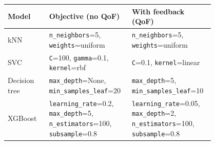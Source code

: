 \begin{tabular}{lp{0.4\linewidth}p{0.4\linewidth}}
\toprule
Model & Objective (no QoF) & With feedback (QoF) \\
\midrule
kNN & \texttt{n\_neighbors}=5, \texttt{weights}=uniform & \texttt{n\_neighbors}=5, \texttt{weights}=uniform \\
SVC & \texttt{C}=100, \texttt{gamma}=0.1, \texttt{kernel}=rbf & \texttt{C}=0.1, \texttt{kernel}=linear \\
Decision tree & \texttt{max\_depth}=None, \texttt{min\_samples\_leaf}=20 & \texttt{max\_depth}=5, \texttt{min\_samples\_leaf}=10 \\
XGBoost & \texttt{learning\_rate}=0.2, \texttt{max\_depth}=5, \texttt{n\_estimators}=100, \texttt{subsample}=0.8 & \texttt{learning\_rate}=0.05, \texttt{max\_depth}=2, \texttt{n\_estimators}=100, \texttt{subsample}=0.8 \\
\bottomrule
\end{tabular}
